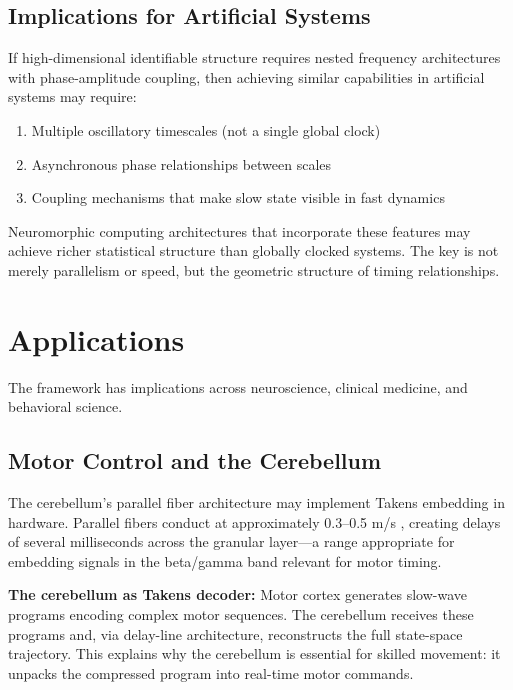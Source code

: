 \documentclass[12pt]{article}
\begin{document}
\subsection{Implications for Artificial Systems}

If high-dimensional identifiable structure requires nested frequency architectures with phase-amplitude coupling, then achieving similar capabilities in artificial systems may require:
\begin{enumerate}
    \item Multiple oscillatory timescales (not a single global clock)
    \item Asynchronous phase relationships between scales
    \item Coupling mechanisms that make slow state visible in fast dynamics
\end{enumerate}

Neuromorphic computing architectures that incorporate these features \citep{indiveri2011neuromorphic,schuman2017survey} may achieve richer statistical structure than globally clocked systems. The key is not merely parallelism or speed, but the geometric structure of timing relationships.

\section{Applications}

The framework has implications across neuroscience, clinical medicine, and behavioral science.

\subsection{Motor Control and the Cerebellum}

The cerebellum's parallel fiber architecture may implement Takens embedding in hardware. Parallel fibers conduct at approximately 0.3--0.5 m/s \citep{eccles1967cerebellum}, creating delays of several milliseconds across the granular layer---a range appropriate for embedding signals in the beta/gamma band relevant for motor timing.

\textbf{The cerebellum as Takens decoder:} Motor cortex generates slow-wave programs encoding complex motor sequences. The cerebellum receives these programs and, via delay-line architecture, reconstructs the full state-space trajectory. This explains why the cerebellum is essential for skilled movement: it unpacks the compressed program into real-time motor commands.
\end{document}
